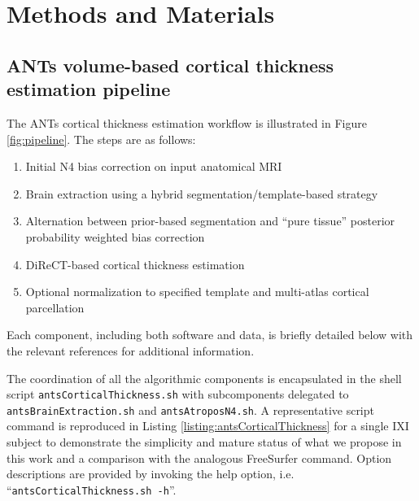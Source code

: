 \section{Methods and Materials}

\subsection{ANTs volume-based cortical thickness estimation pipeline}

The ANTs cortical thickness estimation workflow is illustrated
in Figure \ref{fig:pipeline}.  The steps are as follows:
\begin{enumerate}
  \item Initial N4 bias correction on input anatomical MRI
  \item Brain extraction using a hybrid segmentation/template-based strategy
  \item Alternation between prior-based segmentation and ``pure tissue''
        posterior probability weighted bias correction
  \item DiReCT-based cortical thickness estimation
  \item Optional normalization to specified template and multi-atlas
    cortical parcellation
\end{enumerate}
Each component, including both software and data, is briefly detailed 
below with the relevant references for additional information. 

The coordination of all the algorithmic components is
encapsulated in the shell script {\tt antsCorticalThickness.sh} with
subcomponents delegated to {\tt antsBrainExtraction.sh} 
and {\tt antsAtroposN4.sh}.  A representative script command 
is reproduced in Listing \ref{listing:antsCorticalThickness} for
a single IXI subject to demonstrate the simplicity and
mature status of what we propose in this work and a comparison
with the analogous FreeSurfer command.  
Option descriptions are provided by invoking the
help option, i.e. ``{\tt antsCorticalThickness.sh -h}''.

